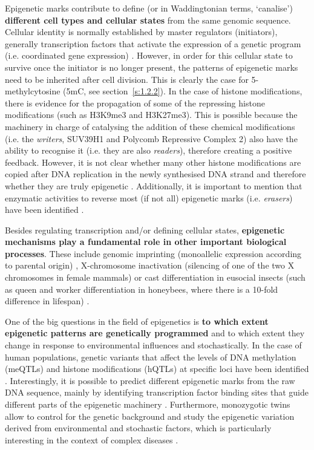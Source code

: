 Epigenetic marks contribute to define (or in Waddingtonian terms, `canalise') \textbf{different cell types and cellular states} from the same genomic sequence. Cellular identity is normally established by master regulators (initiators), generally transcription factors that activate the expression of a genetic program (i.e. coordinated gene expression) \cite{Reinberg2018}. However, in order for this cellular state to survive once the initiator is no longer present, the patterns of epigenetic marks need to be inherited after cell division. This is clearly the case for 5-methylcytosine (\acrshort{5mC}, see section~\ref{s:1.2.2}). In the case of histone modifications, there is evidence for the propagation of some of the repressing histone modifications (such as H3K9me3 and H3K27me3). This is possible because the machinery in charge of catalysing the addition of these chemical modifications (i.e. the \textit{writers}, SUV39H1 and Polycomb Repressive Complex 2) also have the ability to recognise it (i.e. they are also \textit{readers}), therefore creating a positive feedback. However, it is not clear whether many other histone modifications are copied after DNA replication in the newly synthesised DNA strand and therefore whether they are truly epigenetic \cite{Reinberg2018}. Additionally, it is important to mention that enzymatic activities to reverse most (if not all) epigenetic marks (i.e. \textit{erasers}) have been identified \cite{Allis2016}.

\bigskip

Besides regulating transcription and/or defining cellular states, \textbf{epigenetic mechanisms play a fundamental role in other important biological processes}. These include genomic imprinting (monoallelic expression according to parental origin) \cite{Peters2014}, X-chromosome inactivation (silencing of one of the two X chromosomes in female mammals) \cite{Wutz2011} or cast differentiation in eusocial insects (such as queen and worker differentiation in honeybees, where there is a 10-fold difference in lifespan) \cite{Patalano2012,Remolina2008}.

\bigskip

One of the big questions in the field of epigenetics is \textbf{to which extent epigenetic patterns are genetically programmed} and to which extent they change in response to environmental influences and stochastically. In the case of human populations, genetic variants that affect the levels of DNA methylation (\acrshort{meQTLs}) and histone modifications (\acrshort{hQTLs}) at specific loci have been identified \cite{Taudt2016}. Interestingly, it is possible to predict different epigenetic marks from the raw DNA sequence, mainly by identifying transcription factor binding sites that guide different parts of the epigenetic machinery \cite{Whitaker2014}. Furthermore, monozygotic twins allow to control for the genetic background and study the epigenetic variation derived from environmental and stochastic factors, which is particularly interesting in the context of complex diseases \cite{Castillo-Fernandez2014}.

